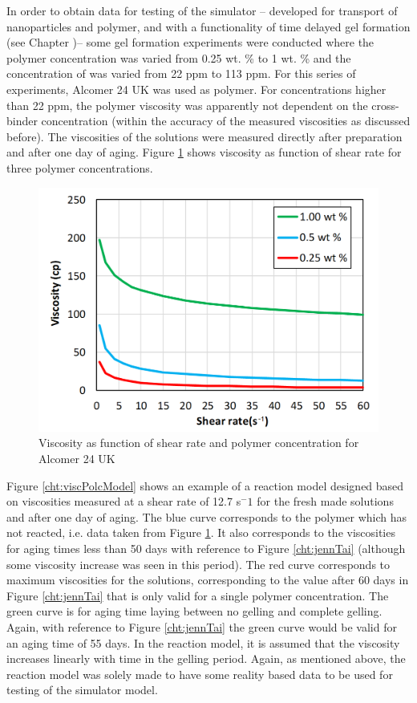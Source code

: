 In order to obtain data for testing of the simulator \--- developed for transport of nanoparticles and polymer, and with a functionality of time delayed gel formation (see Chapter \what)\--- some gel formation experiments were conducted where the polymer concentration was varied from 0.25 wt. \% to 1 wt. \% and the concentration of  was varied from 22 ppm to 113 ppm. For this series of experiments, Alcomer 24 UK was used as polymer. For concentrations higher than 22 ppm, the polymer viscosity was apparently not dependent on the cross-binder concentration (within the accuracy of the measured viscosities as discussed before). The viscosities of the solutions were measured directly after preparation and after one day of aging. Figure \ref{cht:viscAlco} shows viscosity as function of shear rate for three polymer concentrations. 
\begin{figure}
    \centering
    \includegraphics[width=.75\textwidth]{img/cht/viscAlcomer.png}
    \caption{Viscosity as function of shear rate and polymer concentration for Alcomer 24 UK}
    \label{cht:viscAlco}
\end{figure}

Figure \ref{cht:viscPolcModel} shows an example of a reaction model designed based on viscosities measured at a shear rate of 12.7 s$^-1$ for the fresh made solutions and after one day of aging. The blue curve corresponds to the polymer which has not reacted, i.e. data taken from Figure \ref{cht:viscAlco}. It also corresponds to the viscosities for aging times less than 50 days with reference to Figure \ref{cht:jennTai} (although some viscosity increase was seen in this period). The red curve corresponds to maximum viscosities for the solutions, corresponding to the value after 60 days in Figure \ref{cht:jennTai} that is only valid for a single polymer concentration. The green curve is for aging time laying between no gelling and complete gelling. Again, with reference to Figure \ref{cht:jennTai} the green curve would be valid for an aging time of 55 days. In the reaction model, it is assumed that the viscosity increases linearly with time in the gelling period. Again, as mentioned above, the reaction model was solely made to have some reality based data to be used for testing of the simulator model. 

